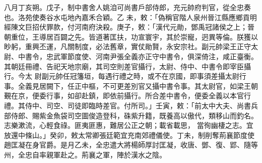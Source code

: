 \begin{pinyinscope}
 八月丁亥朔。戊子，制中書舍人姚洎可尚書戶部侍郎，充元帥府判官，從全忠奏也。洛苑使奏谷水屯地內嘉禾合穎。乙
 未，敕：「偽稱官階人泉州晉江縣應鄉貢明經陳文巨招伏罪款，付河南府決殺。庚子，敕：「漢代元勛，鄧禹冠諸侯之上；晉朝重位，王導居百闢之先。皆道著匡扶，功宣寰宇，其於崇寵，迥異等倫。朕獲以眇躬，重興丕運，凡關制度，必法舊章，實仗勛賢，永安宗社。副元帥梁王正守太尉、中書令，忠武軍節度使、河南尹張全義亦正守中書令，俱深倚注，咸正臺衡。其朝廷冊禮、告祀天地宗廟，其司空則差官攝行，太尉、侍中、中書令即宰臣攝行。今太
 尉副元帥任冠籓垣，每遇行禮之時，或不在京國，即事須差攝太尉行事。全義見居闕下，任正中樞，不可更差別官又攝中書令事。其太尉官，如梁王朝覲在京，便委行事，如卻赴鎮，即依前攝行。所合差中書令，便委全義以本官行禮。其侍中、司空、司徒即臨時差官。付所司。」壬寅，敕：「前太中大夫、尚書兵部侍郎、賜紫金魚袋司空圖俊造登科，硃紫升籍，既養高以傲代，類移山而釣名。志樂漱流，心輕食祿。匪夷匪惠，難居公正之朝；載省載思，
 當徇幽棲之志。宜放還中條山。」癸卯，敕太常卿張廷範宜充南郊禮儀使。丁未，制削奪荊襄節度使趙匡凝在身官爵。是月乙未，全忠遣大將楊師厚討匡凝，收唐、鄧、復、郢、隨等州，全忠自率親軍赴之。荊襄之軍，陣於漢水之陰。




\end{pinyinscope}
